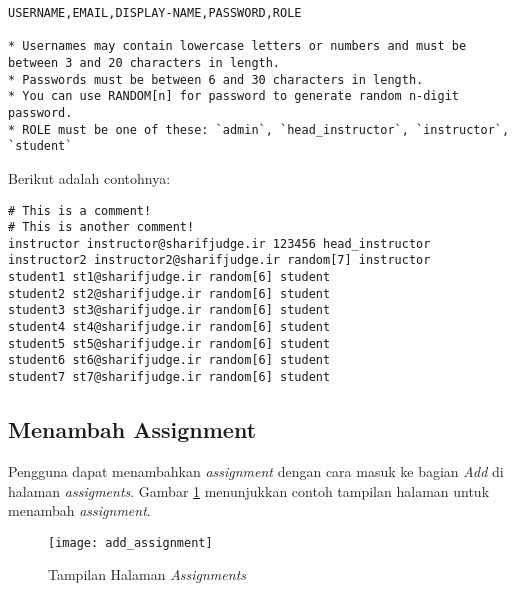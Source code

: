 \begin{lstlisting}[basicstyle=\ttfamily, frame=single,
columns=fullflexible, keepspaces=true, breaklines=true, label=ls:4]
USERNAME,EMAIL,DISPLAY-NAME,PASSWORD,ROLE

* Usernames may contain lowercase letters or numbers and must be between 3 and 20 characters in length.
* Passwords must be between 6 and 30 characters in length.
* You can use RANDOM[n] for password to generate random n-digit password.
* ROLE must be one of these: `admin`, `head_instructor`, `instructor`, `student`
\end{lstlisting}

Berikut adalah contohnya:
\begin{lstlisting}[basicstyle=\ttfamily, frame=single,
columns=fullflexible, keepspaces=true, breaklines=true, label=ls:5]
# This is a comment!
# This is another comment!
instructor instructor@sharifjudge.ir 123456 head_instructor
instructor2 instructor2@sharifjudge.ir random[7] instructor
student1 st1@sharifjudge.ir random[6] student
student2 st2@sharifjudge.ir random[6] student
student3 st3@sharifjudge.ir random[6] student
student4 st4@sharifjudge.ir random[6] student
student5 st5@sharifjudge.ir random[6] student
student6 st6@sharifjudge.ir random[6] student
student7 st7@sharifjudge.ir random[6] student
\end{lstlisting}

\subsection{Menambah Assignment}
\label{subsec:add_assignment}
Pengguna dapat menambahkan \textit{assignment} dengan cara masuk ke bagian \textit{Add} di halaman \textit{assigments}. Gambar \ref{fig:add_assignment} menunjukkan contoh tampilan halaman untuk menambah \textit{assignment}.

\begin{figure}[H]
	\centering  
	\texttt{[image: add\_assignment]}  
	\caption[Tampilan Halaman \textit{Assignments}]{Tampilan Halaman \textit{Assignments}} 
	\label{fig:add_assignment} 
\end{figure} 

